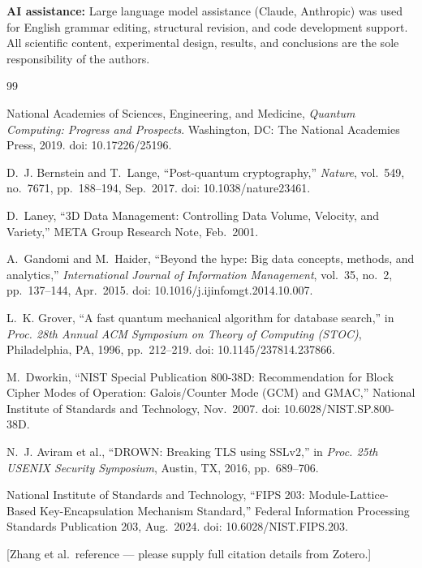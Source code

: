 \documentclass[twocolumn]{article}
\begin{document}
\textbf{AI assistance:} Large language model assistance (Claude, Anthropic) was
used for English grammar editing, structural revision, and code development
support. All scientific content, experimental design, results, and conclusions are
the sole responsibility of the authors.

\begin{thebibliography}{99}

National Academies of Sciences, Engineering, and Medicine,
\textit{Quantum Computing: Progress and Prospects}.
Washington, DC: The National Academies Press, 2019.
doi: 10.17226/25196.

D.~J. Bernstein and T.~Lange,
``Post-quantum cryptography,''
\textit{Nature}, vol.~549, no.~7671, pp.~188--194, Sep.~2017.
doi: 10.1038/nature23461.

D.~Laney,
``3D Data Management: Controlling Data Volume, Velocity, and Variety,''
META Group Research Note, Feb.~2001.

A.~Gandomi and M.~Haider,
``Beyond the hype: Big data concepts, methods, and analytics,''
\textit{International Journal of Information Management},
vol.~35, no.~2, pp.~137--144, Apr.~2015.
doi: 10.1016/j.ijinfomgt.2014.10.007.

L.~K. Grover,
``A fast quantum mechanical algorithm for database search,''
in \textit{Proc. 28th Annual ACM Symposium on Theory of Computing (STOC)},
Philadelphia, PA, 1996, pp.~212--219.
doi: 10.1145/237814.237866.

M.~Dworkin,
``NIST Special Publication 800-38D: Recommendation for Block Cipher Modes
of Operation: Galois/Counter Mode (GCM) and GMAC,''
National Institute of Standards and Technology, Nov.~2007.
doi: 10.6028/NIST.SP.800-38D.

N.~J. Aviram et al.,
``DROWN: Breaking TLS using SSLv2,''
in \textit{Proc. 25th USENIX Security Symposium},
Austin, TX, 2016, pp.~689--706.

National Institute of Standards and Technology,
``FIPS 203: Module-Lattice-Based Key-Encapsulation Mechanism Standard,''
Federal Information Processing Standards Publication 203, Aug.~2024.
doi: 10.6028/NIST.FIPS.203.

[Zhang et al.\ reference --- please supply full citation details from Zotero.]


\end{thebibliography}
\end{document}
